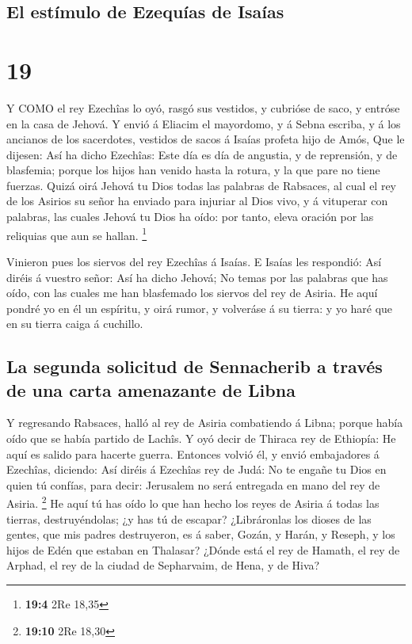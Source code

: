 \hypertarget{el-estuxedmulo-de-ezequuxedas-de-isauxedas}{%
\subsection{El estímulo de Ezequías de
Isaías}\label{el-estuxedmulo-de-ezequuxedas-de-isauxedas}}

\hypertarget{section-18}{%
\section{19}\label{section-18}}

 Y COMO el rey Ezechîas lo oyó, rasgó sus vestidos, y
cubrióse de saco, y entróse en la casa de Jehová.  Y envió á
Eliacim el mayordomo, y á Sebna escriba, y á los ancianos de los
sacerdotes, vestidos de sacos á Isaías profeta hijo de Amós,
 Que le dijesen: Así ha dicho Ezechîas: Este día es día de
angustia, y de reprensión, y de blasfemia; porque los hijos han venido
hasta la rotura, y la que pare no tiene fuerzas.  Quizá oirá
Jehová tu Dios todas las palabras de Rabsaces, al cual el rey de los
Asirios su señor ha enviado para injuriar al Dios vivo, y á vituperar
con palabras, las cuales Jehová tu Dios ha oído: por tanto, eleva
oración por las reliquias que aun se hallan. \footnote{\textbf{19:4} 2Re
  18,35}

 Vinieron pues los siervos del rey Ezechîas á Isaías.
 E Isaías les respondió: Así diréis á vuestro señor: Así ha
dicho Jehová; No temas por las palabras que has oído, con las cuales me
han blasfemado los siervos del rey de Asiria.  He aquí
pondré yo en él un espíritu, y oirá rumor, y volveráse á su tierra: y yo
haré que en su tierra caiga á cuchillo.

\hypertarget{la-segunda-solicitud-de-sennacherib-a-travuxe9s-de-una-carta-amenazante-de-libna}{%
\subsection{La segunda solicitud de Sennacherib a través de una carta
amenazante de
Libna}\label{la-segunda-solicitud-de-sennacherib-a-travuxe9s-de-una-carta-amenazante-de-libna}}

 Y regresando Rabsaces, halló al rey de Asiria combatiendo á
Libna; porque había oído que se había partido de Lachîs.  Y
oyó decir de Thiraca rey de Ethiopía: He aquí es salido para hacerte
guerra. Entonces volvió él, y envió embajadores á Ezechîas, diciendo:
 Así diréis á Ezechîas rey de Judá: No te engañe tu Dios en
quien tú confías, para decir: Jerusalem no será entregada en mano del
rey de Asiria. \footnote{\textbf{19:10} 2Re 18,30}  He aquí
tú has oído lo que han hecho los reyes de Asiria á todas las tierras,
destruyéndolas; ¿y has tú de escapar?  ¿Libráronlas los
dioses de las gentes, que mis padres destruyeron, es á saber, Gozán, y
Harán, y Reseph, y los hijos de Edén que estaban en Thalasar?
 ¿Dónde está el rey de Hamath, el rey de Arphad, el rey de
la ciudad de Sepharvaim, de Hena, y de Hiva?

